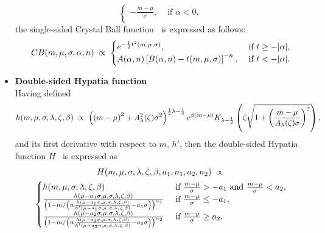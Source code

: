 \begin{itemize}[noitemsep,topsep=0pt]
\begin{equation*}
\begin{cases}
  -\frac{m-\mu}{\sigma}, & \mbox{ if } \alpha<0, \\
\end{cases}  
\end{equation*}
the single-sided Crystal Ball function~\cite{Skwarnicki:1986xj} is expressed as follows:
\begin{equation*}
CB(m,\mu,\sigma,\alpha,n) \hspace{1mm}\propto\hspace{1mm}
\begin{cases}
e^{-\frac{1}{2}t^2(m,\mu,\sigma)}, & \mbox{ if } t\geq-|\alpha|, \\
A(\alpha,n)\left[B(\alpha,n)-t(m,\mu,\sigma)\right]^{-n}, & \mbox{ if } t<-|\alpha|.
\end{cases}
\end{equation*}
\item{\textbf{Double-sided Hypatia function}} \\
Having defined
\begin{equation*}
h(m,\mu,\sigma,\lambda,\zeta,\beta) \hspace{1mm}\propto\hspace{1mm} \left(\left(m-\mu\right)^{2}+A_{\lambda}^{2}(\zeta)\sigma^{2}\right)^{\frac{1}{2}\lambda-\frac{1}{4}}e^{\beta\left(m-\mu\right)}K_{\lambda-\frac{1}{2}}\left(\zeta\sqrt{1+\left(\frac{m-\mu}{A_{\lambda}(\zeta)\sigma}\right)^{2}}\right),
\end{equation*}
and its first derivative with respect to $m$, $h'$, then the double-sided Hypatia function $H$~\cite{Hypatia} is expressed as
\begin{multline*}
H(m,\mu,\sigma,\lambda,\zeta,\beta,a_{1},n_{1},a_{2},n_{2}) \hspace{1mm}\propto\hspace{1mm} \\
\begin{cases}
h(m,\mu,\sigma,\lambda,\zeta,\beta) & \mbox{ if } \frac{m-\mu}{\sigma}>-a_{1} \mbox{ and } \frac{m-\mu}{\sigma}<a_{2}, \\
\frac{h(\mu-a_{1}\sigma,\mu,\sigma,\lambda,\zeta,\beta)}{\left(1-m/\left(n\frac{h(\mu-a_{1}\sigma,\mu,\sigma,\lambda,\zeta,\beta)}{h'(\mu-a_{1}\sigma,\mu,\sigma,\lambda,\zeta,\beta)}-a_{1}\sigma\right)\right)^{n_{1}}} & \mbox{ if } \frac{m-\mu}{\sigma}\leq-a_{1}, \\
\frac{h(\mu-a_{2}\sigma,\mu,\sigma,\lambda,\zeta,\beta)}{\left(1-m/\left(n\frac{h(\mu-a_{2}\sigma,\mu,\sigma,\lambda,\zeta,\beta)}{h'(\mu-a_{2}\sigma,\mu,\sigma,\lambda,\zeta,\beta)}-a_{2}\sigma\right)\right)^{n_{2}}} & \mbox{ if } \frac{m-\mu}{\sigma}\geq a_{2}.

\end{cases}
\end{multline*}
\end{itemize}
